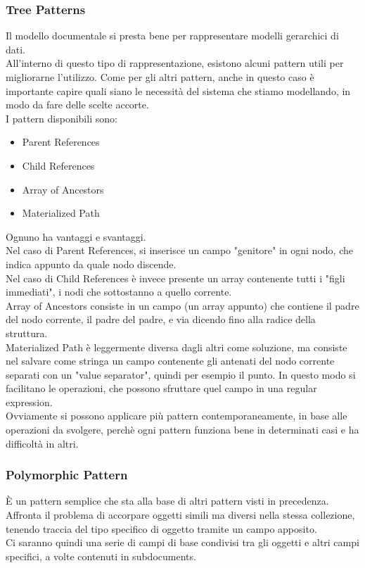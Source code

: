 \subsubsection{Tree Patterns}
Il modello documentale si presta bene per rappresentare modelli gerarchici di dati.\\
All'interno di questo tipo di rappresentazione, esistono alcuni pattern utili per migliorarne l'utilizzo. Come per gli altri pattern, anche in questo caso è importante capire quali siano le necessità del sistema che stiamo modellando, in modo da fare delle scelte accorte.\\
I pattern disponibili sono:
\begin{itemize}
    \item Parent References
    \item Child References
    \item Array of Ancestors
    \item Materialized Path
\end{itemize}
\noindent Ognuno ha vantaggi e svantaggi.\\
Nel caso di Parent References, si inserisce un campo "genitore" in ogni nodo, che indica appunto da quale nodo discende.\\
Nel caso di Child References è invece presente un array contenente tutti i "figli immediati", i nodi che sottostanno a quello corrente.\\
Array of Ancestors consiste in un campo (un array appunto) che contiene il padre del nodo corrente, il padre del padre, e via dicendo fino alla radice della struttura.\\
Materialized Path è leggermente diversa dagli altri come soluzione, ma consiste nel salvare come stringa un campo contenente gli antenati del nodo corrente separati con un "value separator", quindi per esempio il punto. In questo modo si facilitano le operazioni, che possono sfruttare quel campo in una regular expression.\\
Ovviamente si possono applicare più pattern contemporaneamente, in base alle operazioni da svolgere, perchè ogni pattern funziona bene in determinati casi e ha difficoltà in altri.\\

\subsubsection{Polymorphic Pattern}
È un pattern semplice che sta alla base di altri pattern visti in precedenza. Affronta il problema di accorpare oggetti simili ma diversi nella stessa collezione, tenendo traccia del tipo specifico di oggetto tramite un campo apposito.\\
Ci saranno quindi una serie di campi di base condivisi tra gli oggetti e altri campi specifici, a volte contenuti in subdocuments.\\

